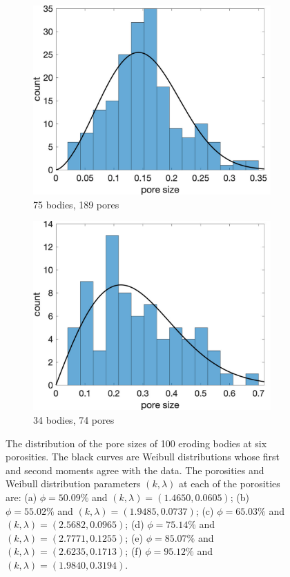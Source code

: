 \documentclass{jfm}
\begin{document}
\begin{figure}
\begin{subfigure}[b]{0.33\textwidth}
\includegraphics*[width =\linewidth]{./figs/hist100b_207}
\caption{75 bodies, 189 pores}
\end{subfigure}%
\begin{subfigure}[b]{0.33\textwidth}
\includegraphics*[width =\linewidth]{./figs/hist100b_246}
\caption{34 bodies, 74 pores}
\end{subfigure}
\caption{\label{fig:Eroding100gap_hist} The distribution of the pore
sizes of 100 eroding bodies at six porosities. The black curves are
Weibull distributions whose first and second moments agree with the
data. The porosities and Weibull distribution parameters $(k,\lambda)$
at each of the porosities are: (a) $\phi = 50.09\%$ and
$(k,\lambda)=(1.4650,0.0605)$; (b) $\phi = 55.02\%$ and
$(k,\lambda)=(1.9485,0.0737)$; (c) $\phi = 65.03\%$ and
$(k,\lambda)=(2.5682,0.0965)$; (d) $\phi = 75.14\%$ and
$(k,\lambda)=(2.7771,0.1255)$; (e) $\phi = 85.07\%$ and
$(k,\lambda)=(2.6235,0.1713)$; (f) $\phi = 95.12\%$ and
$(k,\lambda)=(1.9840, 0.3194)$.}
\end{figure}
\end{document}
